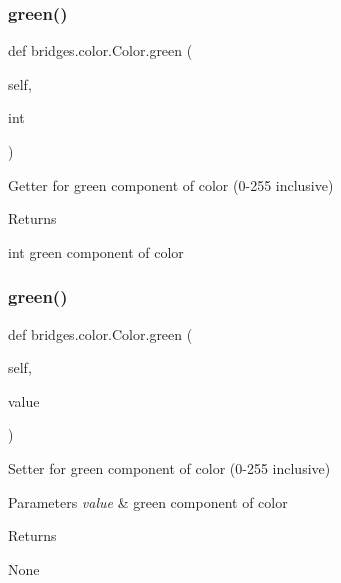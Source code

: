 \subsubsection{\texorpdfstring{green()}{green()}\hspace{0.1cm}{\footnotesize\ttfamily [1/2]}}
{\footnotesize\ttfamily def bridges.\+color.\+Color.\+green (\begin{DoxyParamCaption}\item[{}]{self,  }\item[{}]{int }\end{DoxyParamCaption})}



Getter for green component of color (0-\/255 inclusive) 

\begin{DoxyReturn}{Returns}


int green component of color 
\end{DoxyReturn}
\mbox{\label{classbridges_1_1color_1_1_color_a4c0826514c64b53910270336d357ad80}} 
\subsubsection{\texorpdfstring{green()}{green()}\hspace{0.1cm}{\footnotesize\ttfamily [2/2]}}
{\footnotesize\ttfamily def bridges.\+color.\+Color.\+green (\begin{DoxyParamCaption}\item[{}]{self,  }\item[{}]{value }\end{DoxyParamCaption})}



Setter for green component of color (0-\/255 inclusive) 


\begin{DoxyParams}{Parameters}
{\em value} & green component of color \\
\hline
\end{DoxyParams}
\begin{DoxyReturn}{Returns}


None 
\end{DoxyReturn}
\mbox{\label{classbridges_1_1color_1_1_color_ab2b29fe67b6ad8dddde7ff8eddedcce0}} 
